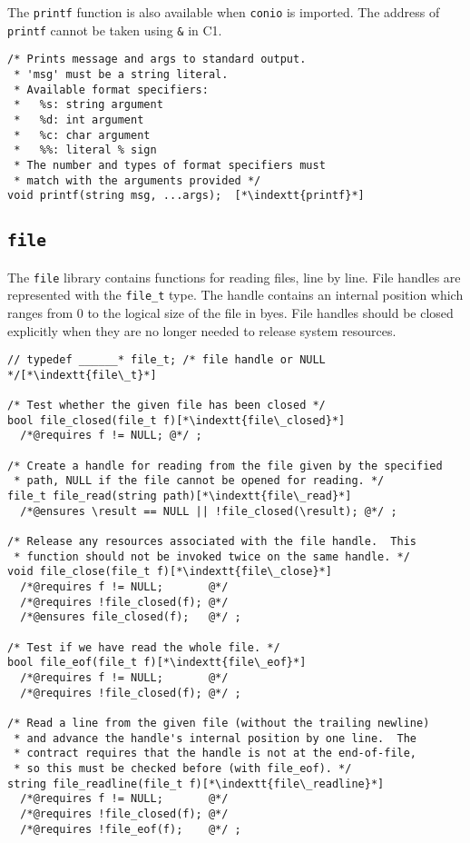 \documentclass[11pt]{article}
\makeatletter
\newcommand{\indextt}[1]{\index{#1@\texttt{#1}}}
\makeatother
\begin{document}
The \lstinline'printf' function is also available when \lstinline'conio' is imported.
The address of \lstinline'printf' cannot be taken using \lstinline'&' in C1.
\begin{lstlisting}
/* Prints message and args to standard output.
 * 'msg' must be a string literal.
 * Available format specifiers:
 *   %s: string argument
 *   %d: int argument
 *   %c: char argument
 *   %%: literal % sign
 * The number and types of format specifiers must
 * match with the arguments provided */
void printf(string msg, ...args);  [*\indextt{printf}*]
\end{lstlisting}

\newpage
\subsection{\tt file}

The \lstinline'file' library contains functions for reading files, line by
line.  File handles are represented with the \lstinline'file_t' type.  The
handle contains an internal position which ranges from 0 to the
logical size of the file in byes.  File handles should be closed
explicitly when they are no longer needed to release system resources.

\begin{lstlisting}
// typedef ______* file_t; /* file handle or NULL */[*\indextt{file\_t}*]

/* Test whether the given file has been closed */
bool file_closed(file_t f)[*\indextt{file\_closed}*]
  /*@requires f != NULL; @*/ ;

/* Create a handle for reading from the file given by the specified
 * path, NULL if the file cannot be opened for reading. */
file_t file_read(string path)[*\indextt{file\_read}*]
  /*@ensures \result == NULL || !file_closed(\result); @*/ ;

/* Release any resources associated with the file handle.  This
 * function should not be invoked twice on the same handle. */
void file_close(file_t f)[*\indextt{file\_close}*]
  /*@requires f != NULL;       @*/
  /*@requires !file_closed(f); @*/
  /*@ensures file_closed(f);   @*/ ;

/* Test if we have read the whole file. */
bool file_eof(file_t f)[*\indextt{file\_eof}*]
  /*@requires f != NULL;       @*/
  /*@requires !file_closed(f); @*/ ;

/* Read a line from the given file (without the trailing newline)
 * and advance the handle's internal position by one line.  The
 * contract requires that the handle is not at the end-of-file,
 * so this must be checked before (with file_eof). */
string file_readline(file_t f)[*\indextt{file\_readline}*]
  /*@requires f != NULL;       @*/
  /*@requires !file_closed(f); @*/
  /*@requires !file_eof(f);    @*/ ;
\end{lstlisting}
\end{document}
